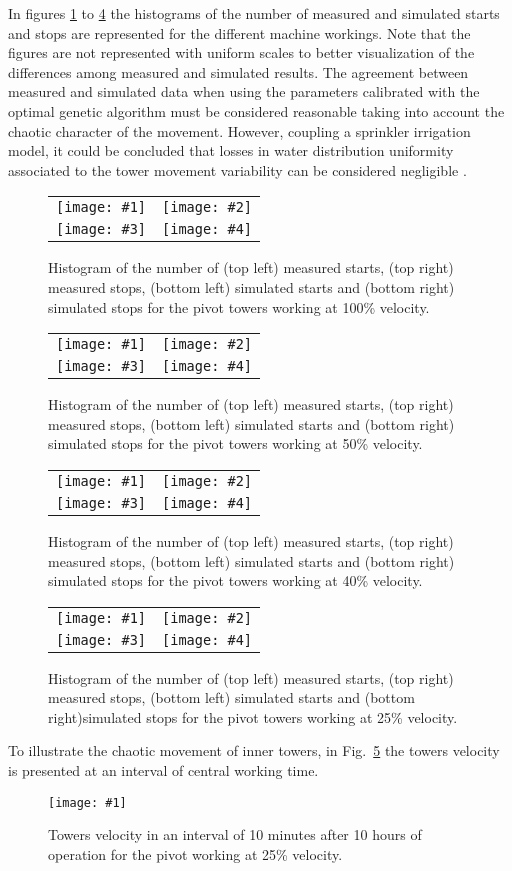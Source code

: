\documentclass[review,authoryear]{elsarticle}
\newcommand{\FIG}[3]
{
	\begin{figure}[ht!]
		\centering
		\texttt{[image: \#1]}
		\caption{#2.\label{#3}}
	\end{figure}
}
\newcommand{\FIGIV}[6]
{
	\begin{figure}[ht!]
		\centering
		\begin{tabular}{cc}
			\texttt{[image: \#1]} & \texttt{[image: \#2]} \\
			\texttt{[image: \#3]} & \texttt{[image: \#4]}
		\end{tabular}
		\caption{#5.\label{#6}}
	\end{figure}
}
\begin{document}
In figures \ref{FigPivot100} to \ref{FigPivot25} the histograms of the number
of measured and simulated starts and stops are represented for the different
machine workings.
Note that the figures are not represented with uniform scales to better
visualization of the differences among measured and simulated results.
The agreement between measured and simulated data when using the parameters calibrated with the optimal genetic algorithm must be considered reasonable taking into account the chaotic character of the movement.
However, coupling a sprinkler irrigation model, it could be concluded that losses in water distribution uniformity associated to the tower movement variability can be considered negligible \citep{Ouazaa15}.

\FIGIV{pivot-measured-starts-100.eps}{pivot-measured-stops-100.eps}
{pivot-simulated-starts-100.eps}{pivot-simulated-stops-100.eps}
{Histogram of the number of (top left) measured starts, (top right) measured stops, (bottom left)
simulated starts and (bottom right) simulated stops for the pivot towers working at 100\%
velocity}{FigPivot100}

\FIGIV{pivot-measured-starts-50.eps}{pivot-measured-stops-50.eps}
{pivot-simulated-starts-50.eps}{pivot-simulated-stops-50.eps}
{Histogram of the number of (top left) measured starts, (top right) measured stops, (bottom left)
simulated starts and (bottom right) simulated stops for the pivot towers working at 50\%
velocity}{FigPivot50}

\FIGIV{pivot-measured-starts-40.eps}{pivot-measured-stops-40.eps}
{pivot-simulated-starts-40.eps}{pivot-simulated-stops-40.eps}
{Histogram of the number of (top left) measured starts, (top right) measured stops, (bottom left)
simulated starts and (bottom right) simulated stops for the pivot towers working at 40\%
velocity}{FigPivot40}

\FIGIV{pivot-measured-starts-25.eps}{pivot-measured-stops-25.eps}
{pivot-simulated-starts-25.eps}{pivot-simulated-stops-25.eps}
{Histogram of the number of (top left) measured starts, (top right) measured stops, (bottom left)
simulated starts and (bottom right)simulated stops for the pivot towers working at 25\% velocity}{FigPivot25}

To illustrate the chaotic movement of inner towers, in
Fig.~\ref{FigPivotV} the towers velocity is presented at an interval of
central working time.
\FIG{pivot-velocity.eps}
{Towers velocity in an interval of 10 minutes after 10 hours of operation for
the pivot working at 25\% velocity}{FigPivotV}
\end{document}
